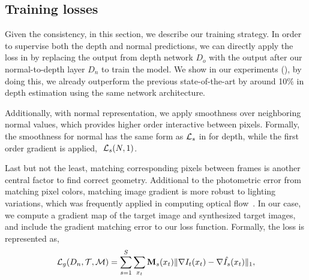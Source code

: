 \vspace{-0\baselineskip}
\subsection{Training losses}
\label{sub:training_losses}
\vspace{-0.\baselineskip}

Given the consistency, in this section, we describe our training strategy. In order to supervise both the depth and normal predictions, we can directly apply the loss in  by replacing the output from depth network $D_o$ with the output after our normal-to-depth layer $D_n$ to train the model. We show in our experiments (), by doing this, we already outperform the previous state-of-the-art by around 10$\%$ in depth estimation using the same network architecture.

Additionally, with normal representation, we apply smoothness over neighboring normal values, which provides higher order interactive between pixels. Formally, the smoothness for normal has the same form as ${\mathcal L}_{s}$ in  for depth, while the first order gradient is applied, \ie $~{\mathcal L}_{s}(N, 1)$. 

Last but not the least, matching corresponding pixels between frames is another central factor to find correct geometry. Additional to the photometric error from matching pixel colors, matching image gradient is more robust to lighting variations, which was frequently applied in computing optical flow~\cite{li2017pyramidal}. 
In our case, we compute a gradient map of the target image and synthesized target images, and include the gradient matching error to our loss function. Formally, the loss is represented as,
\begin{equation}
\label{equ:gradient}
{\mathcal L}_{g}(D_n, {\mathcal T}, {\mathcal M}) = \sum_{s=1}^{S}\sum_{x_t}{\mathbf M}_s(x_t)\|\nabla I_t(x_t) - \nabla \hat{I_s}(x_t)\|_1, \nonumber
\end{equation}

